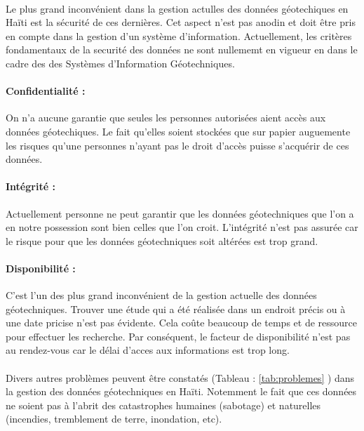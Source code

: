 \paragraph{}
Le plus grand inconvénient dans la gestion actulles des données géotechiques
en Haïti est la sécurité de ces dernières. 
Cet aspect n'est pas anodin et doit être pris en compte dans la gestion d'un système
d'information.
Actuellement, les critères fondamentaux de la securité des données ne sont nullememt en vigueur en dans le cadre des 
des Systèmes d'Information Géotechniques.
\paragraph{Confidentialité : }
On n'a aucune garantie que seules les personnes autorisées 
aient accès aux données géotechiques. Le fait qu'elles soient
stockées que sur papier auguemente les risques qu'une personnes
n'ayant pas le droit d'accès puisse s'acquérir de ces données.
\paragraph{Intégrité : }
Actuellement personne ne peut
garantir que les données géotechniques que l'on a en notre possession 
sont bien celles que l’on croit. L'intégrité n'est pas assurée car le risque
pour que les données géotechniques soit altérées est trop grand.
\paragraph{Disponibilité :}
C'est l'un des plus grand inconvénient de la gestion actuelle des 
données géotechniques. Trouver une étude qui a été réalisée dans un endroit précis
ou à une date pricise n'est pas évidente. Cela coûte beaucoup de temps et de ressource pour effectuer
les recherche. Par conséquent, le facteur de disponibilité n'est pas 
au rendez-vous car le délai d'acces aux informations est trop long.

\paragraph{}
Divers autres problèmes peuvent être constatés (Tableau : \ref{tab:problemes} )  dans la gestion
des données géotechniques en Haïti. Notemment le fait que ces données
ne soient pas à l'abrit des catastrophes humaines (sabotage) et naturelles
(incendies, tremblement de terre, inondation, etc).


